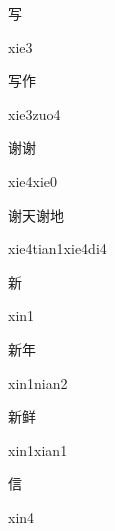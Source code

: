 \begin{multicols*}{2}
\begin{verbete}[xie3]{写}
\begin{pronuncia}{xie3}
\end{pronuncia}
\end{verbete}

\begin{verbete}{写作}
\begin{pronuncia}{xie3zuo4}
\end{pronuncia}
\end{verbete}

\begin{verbete}{谢谢}
\begin{pronuncia}{xie4xie0}
\end{pronuncia}
\end{verbete}

\begin{verbete}{谢天谢地}
\begin{pronuncia}{xie4tian1xie4di4}
\end{pronuncia}
\end{verbete}

\begin{verbete}[xin1]{新}
\begin{pronuncia}{xin1}
\end{pronuncia}
\end{verbete}

\begin{verbete}{新年}
\begin{pronuncia}{xin1nian2}
\end{pronuncia}
\end{verbete}

\begin{verbete}{新鲜}
\begin{pronuncia}{xin1xian1}
\end{pronuncia}
\end{verbete}

\begin{verbete}[xin4]{信}
\begin{pronuncia}{xin4}
\end{pronuncia}
\end{verbete}


\end{multicols*}
